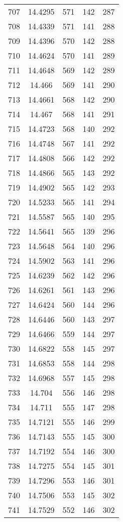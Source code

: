 \documentclass[12pt,a4paper]{article}
\begin{document}
\begin{tabular}{r|cccc}
	707 & 14.4295 & 571 & 142 & 287 \\
	708 & 14.4339 & 571 & 141 & 288 \\
	709 & 14.4396 & 570 & 142 & 288 \\
	710 & 14.4624 & 570 & 141 & 289 \\
	711 & 14.4648 & 569 & 142 & 289 \\
	712 & 14.466 & 569 & 141 & 290 \\
	713 & 14.4661 & 568 & 142 & 290 \\
	714 & 14.467 & 568 & 141 & 291 \\
	715 & 14.4723 & 568 & 140 & 292 \\
	716 & 14.4748 & 567 & 141 & 292 \\
	717 & 14.4808 & 566 & 142 & 292 \\
	718 & 14.4866 & 565 & 143 & 292 \\
	719 & 14.4902 & 565 & 142 & 293 \\
	720 & 14.5233 & 565 & 141 & 294 \\
	721 & 14.5587 & 565 & 140 & 295 \\
	722 & 14.5641 & 565 & 139 & 296 \\
	723 & 14.5648 & 564 & 140 & 296 \\
	724 & 14.5902 & 563 & 141 & 296 \\
	725 & 14.6239 & 562 & 142 & 296 \\
	726 & 14.6261 & 561 & 143 & 296 \\
	727 & 14.6424 & 560 & 144 & 296 \\
	728 & 14.6446 & 560 & 143 & 297 \\
	729 & 14.6466 & 559 & 144 & 297 \\
	730 & 14.6822 & 558 & 145 & 297 \\
	731 & 14.6853 & 558 & 144 & 298 \\
	732 & 14.6968 & 557 & 145 & 298 \\
	733 & 14.704 & 556 & 146 & 298 \\
	734 & 14.711 & 555 & 147 & 298 \\
	735 & 14.7121 & 555 & 146 & 299 \\
	736 & 14.7143 & 555 & 145 & 300 \\
	737 & 14.7192 & 554 & 146 & 300 \\
	738 & 14.7275 & 554 & 145 & 301 \\
	739 & 14.7296 & 553 & 146 & 301 \\
	740 & 14.7506 & 553 & 145 & 302 \\
	741 & 14.7529 & 552 & 146 & 302 \\

\end{tabular}
\end{document}
